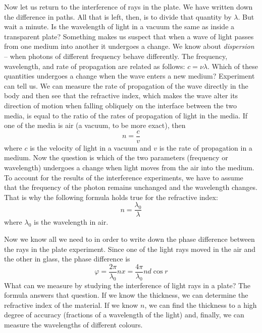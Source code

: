 Now let us return to the interference of rays in the plate. We have written down the difference in paths. All that is left, then, is to divide that quantity by $\lambda$. But wait a minute. Is the wavelength of light in a vacuum the same as inside a transparent plate? Something makes us suspect that when a wave of light passes from one medium into another it undergoes a change. We know about \emph{dispersion} -- when photons of different frequency behave differently. The frequency, wavelength, and rate of propagation are related as follows: $c=\nu \lambda$. Which of these quantities undergoes a change when the wave enters a new medium? Experiment can tell us. We can measure the rate of propagation of the wave directly in the body and then see that the refractive index, which makes the wave alter its direction of motion when falling obliquely on the interface between the two media, is equal to the ratio of the rates of propagation of light in the media. If one of the media is air (a vacuum, to be more exact), then 
\begin{equation*}%
n = \frac{c}{v}
\end{equation*}
where $c$ is the velocity of light in a vacuum and $v$ is the rate of propagation in a medium. Now the question is which of the two parameters (frequency or wavelength) undergoes a change when light moves from the air into the medium. To account for the results of the interference experiments, we have to assume that the frequency of the photon remains unchanged and the wavelength changes. That is why the following formula holds true for the refractive index:
\begin{equation*}%
n = \frac{\lambda_{0}}{\lambda}
\end{equation*}
where $\lambda_{0}$ is the wavelength in air. 

Now we know all we need to in order to write down the phase difference between the rays in the plate experiment. Since one of the light rays moved in the air and the other in glass, the phase difference is
\begin{equation*}%
\varphi = \frac{2 \pi}{\lambda_{0}} nx = \frac{4 \pi}{\lambda_{0}}nd \cos r
\end{equation*}
What can we measure by studying the interference of light rays in a plate? The formula answers that question. If we know the thickness, we can determine the refractive index of the material. If we know $n$, we can find the thickness to a high degree of accuracy (fractions of a wavelength of the light) and, finally, we can measure the wavelengths of different colours.

